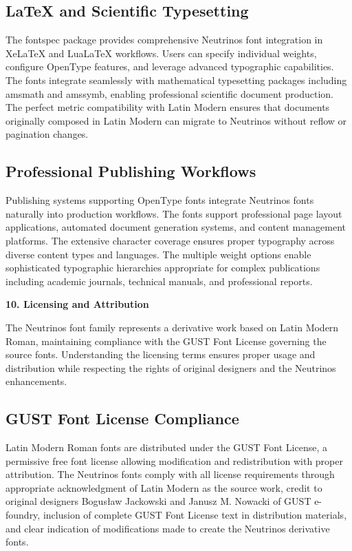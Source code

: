\documentclass[11pt,letterpaper]{article}
\newcommand{\sectionheader}[1]{%
\vspace{1em}
\noindent
\colorbox{neutrinosblue}{%
\begin{minipage}{\textwidth}
\vspace{0.3em}
{\color{white}\LARGE\textbf{#1}}
\vspace{0.3em}
\end{minipage}}
\vspace{0.5em}
}
\begin{document}
\subsection{LaTeX and Scientific Typesetting}

The fontspec package provides comprehensive Neutrinos font integration in XeLaTeX and LuaLaTeX workflows. Users can specify individual weights, configure OpenType features, and leverage advanced typographic capabilities. The fonts integrate seamlessly with mathematical typesetting packages including amsmath and amssymb, enabling professional scientific document production. The perfect metric compatibility with Latin Modern ensures that documents originally composed in Latin Modern can migrate to Neutrinos without reflow or pagination changes.

\subsection{Professional Publishing Workflows}

Publishing systems supporting OpenType fonts integrate Neutrinos fonts naturally into production workflows. The fonts support professional page layout applications, automated document generation systems, and content management platforms. The extensive character coverage ensures proper typography across diverse content types and languages. The multiple weight options enable sophisticated typographic hierarchies appropriate for complex publications including academic journals, technical manuals, and professional reports.

\newpage

\sectionheader{10. Licensing and Attribution}

The Neutrinos font family represents a derivative work based on Latin Modern Roman, maintaining compliance with the GUST Font License governing the source fonts. Understanding the licensing terms ensures proper usage and distribution while respecting the rights of original designers and the Neutrinos enhancements.

\subsection{GUST Font License Compliance}

Latin Modern Roman fonts are distributed under the GUST Font License, a permissive free font license allowing modification and redistribution with proper attribution. The Neutrinos fonts comply with all license requirements through appropriate acknowledgment of Latin Modern as the source work, credit to original designers Bogusław Jackowski and Janusz M. Nowacki of GUST e-foundry, inclusion of complete GUST Font License text in distribution materials, and clear indication of modifications made to create the Neutrinos derivative fonts.
\end{document}
